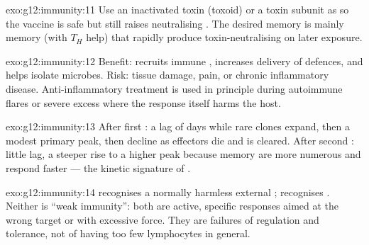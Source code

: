 \begin{solution}{exo:g12:immunity:11}
Use an inactivated toxin (toxoid) or a toxin subunit as  so the vaccine
is safe but still raises neutralising . The desired memory is mainly
memory  (with $T_H$ help) that rapidly produce toxin-neutralising
 on later exposure.
\end{solution}

\begin{solution}{exo:g12:immunity:12}
Benefit:  recruits immune , increases delivery of defences,
and helps isolate microbes. Risk: tissue damage, pain, or chronic inflammatory
disease. Anti-inflammatory treatment is used in principle during autoimmune
flares or severe excess  where the response itself harms the host.
\end{solution}

\begin{solution}{exo:g12:immunity:13}
After first : a lag of days while rare clones expand, then a modest
primary peak, then decline as effectors die and  is cleared. After
second : little lag, a steeper rise to a higher  peak because
memory  are more numerous and respond faster --- the kinetic signature of
.
\end{solution}

\begin{solution}{exo:g12:immunity:14}
 recognises a normally harmless external ; 
recognises . Neither is ``weak immunity'': both are active,
specific responses aimed at the wrong target or with excessive force. They are
failures of regulation and tolerance, not of having too few lymphocytes in
general.
\end{solution}

